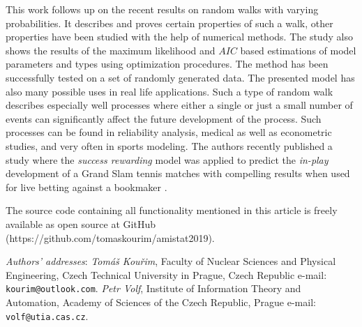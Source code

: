 \documentclass{amsart}
\theoremstyle{definition}
\theoremstyle{plain}
\theoremstyle{plain}
\theoremstyle{plain}
\numberwithin{equation}{section}
\begin{document}
This work follows up on the recent results on random walks with varying
probabilities. It describes and proves certain properties of such
a walk, other properties have been studied with the help of numerical
methods. The study also shows the results of the maximum likelihood
and $AIC$ based estimations of model parameters and types using optimization
procedures. The method has been successfully tested on a set of randomly
generated data. The presented model has also many possible uses in
real life applications. Such a type of random walk describes especially
well processes where either a single or just a small number of events
can significantly affect the future development of the process. Such
processes can be found in reliability analysis, medical as well as
econometric studies, and very often in sports modeling. The authors
recently published a study where the \emph{\color{red}success rewarding} model was applied
to predict the \emph{in-play} development of a Grand Slam tennis matches
with compelling results when used for live betting against a bookmaker
\cite{ja2019imam}.

The source code containing all functionality mentioned in this article
is freely available as open source at
GitHub (https://github.com/tomaskourim/amistat2019).





{\small
{\em Authors' addresses}:
{\em Tom\'{a}\v{s} Kou\v{r}im}, Faculty of Nuclear Sciences and Physical Engineering, Czech Technical University in Prague,
Czech Republic
 e-mail: \texttt{kourim@\allowbreak outlook.com}.
{\em Petr Volf}, Institute of Information Theory and Automation, Academy of Sciences of the Czech Republic, Prague
 e-mail: \texttt{volf@\allowbreak utia.cas.cz}.
}
\end{document}
